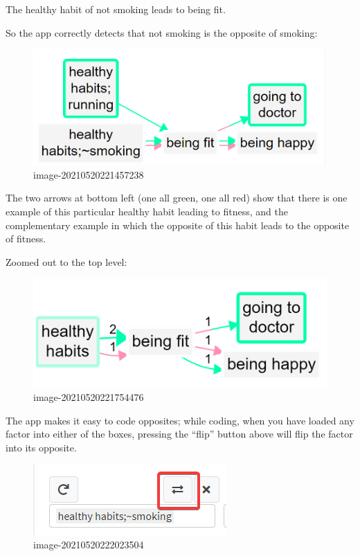 \documentclass[
]{book}
\begin{document}
The healthy habit of not smoking leads to being fit.

So the app correctly detects that not smoking is the opposite of smoking:

\begin{figure}
\centering
\includegraphics[width=6.77083in,height=\textheight]{_assets/image-20210520221457238.png}
\caption{image-20210520221457238}
\end{figure}

The two arrows at bottom left (one all green, one all red) show that there is one example of this particular healthy habit leading to fitness, and the complementary example in which the opposite of this habit leads to the opposite of fitness.

Zoomed out to the top level:

\begin{figure}
\centering
\includegraphics[width=6.77083in,height=\textheight]{_assets/image-20210520221754476.png}
\caption{image-20210520221754476}
\end{figure}

The app makes it easy to code opposites; while coding, when you have loaded any factor into either of the boxes, pressing the ``flip'' button above will flip the factor into its opposite.

\begin{figure}
\centering
\includegraphics{_assets/image-20210520222023504.png}
\caption{image-20210520222023504}
\end{figure}
\end{document}
